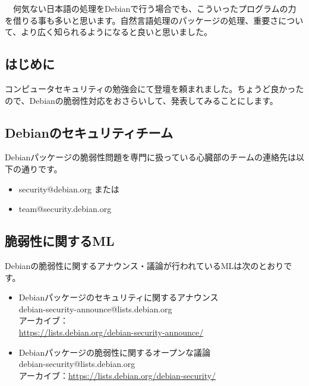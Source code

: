 \documentclass[mingoth,a4paper]{jsarticle}
\begin{document}
　何気ない日本語の処理をDebianで行う場合でも、こういったプログラムの力を借りる事も多いと思います。自然言語処理のパッケージの処理、重要さについて、より広く知られるようになると良いと思いました。
 


\subsection{はじめに}

 コンピュータセキュリティの勉強会にて登壇を頼まれました。ちょうど良かったので、Debianの脆弱性対応をおさらいして、発表してみることにします。

\subsection{Debianのセキュリティチーム}

 Debianパッケージの脆弱性問題を専門に扱っている心臓部のチームの連絡先は以下の通りです。

\begin{itemize}
\item security@debian.org または 
\item team@security.debian.org
\end{itemize}

\subsection{脆弱性に関するML}

 Debianの脆弱性に関するアナウンス・議論が行われているMLは次のとおりです。

 \begin{itemize}
 \item  Debianパッケージのセキュリティに関するアナウンス\\
debian-security-announce@lists.debian.org\\
アーカイブ：\\
\url{https://lists.debian.org/debian-security-announce/}
 \item  Debianパッケージの脆弱性に関するオープンな議論\\
debian-security@lists.debian.org\\
アーカイブ：\url{https://lists.debian.org/debian-security/}
 \end{itemize}
\end{document}
